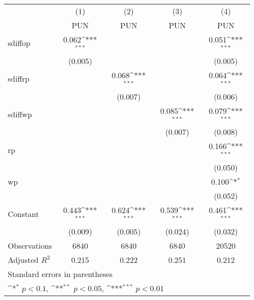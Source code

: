 {
\def\sym#1{\ifmmode^{#1}\else\(^{#1}\)\fi}
\begin{tabular}{l*{4}{c}}
\toprule
                    &\multicolumn{1}{c}{(1)}&\multicolumn{1}{c}{(2)}&\multicolumn{1}{c}{(3)}&\multicolumn{1}{c}{(4)}\\
                    &\multicolumn{1}{c}{PUN}&\multicolumn{1}{c}{PUN}&\multicolumn{1}{c}{PUN}&\multicolumn{1}{c}{PUN}\\
\midrule
sdiffop             &       0.062\sym{***}&                     &                     &       0.051\sym{***}\\
                    &     (0.005)         &                     &                     &     (0.005)         \\
\addlinespace
sdiffrp             &                     &       0.068\sym{***}&                     &       0.064\sym{***}\\
                    &                     &     (0.007)         &                     &     (0.006)         \\
\addlinespace
sdiffwp             &                     &                     &       0.085\sym{***}&       0.079\sym{***}\\
                    &                     &                     &     (0.007)         &     (0.008)         \\
\addlinespace
rp                  &                     &                     &                     &       0.166\sym{***}\\
                    &                     &                     &                     &     (0.050)         \\
\addlinespace
wp                  &                     &                     &                     &       0.100\sym{*}  \\
                    &                     &                     &                     &     (0.052)         \\
\addlinespace
Constant            &       0.443\sym{***}&       0.624\sym{***}&       0.539\sym{***}&       0.461\sym{***}\\
                    &     (0.009)         &     (0.005)         &     (0.024)         &     (0.032)         \\
\midrule
Observations        &        6840         &        6840         &        6840         &       20520         \\
Adjusted \(R^{2}\)  &       0.215         &       0.222         &       0.251         &       0.212         \\
\bottomrule
\multicolumn{5}{l}{\footnotesize Standard errors in parentheses}\\
\multicolumn{5}{l}{\footnotesize \sym{*} \(p<0.1\), \sym{**} \(p<0.05\), \sym{***} \(p<0.01\)}\\
\end{tabular}
}
